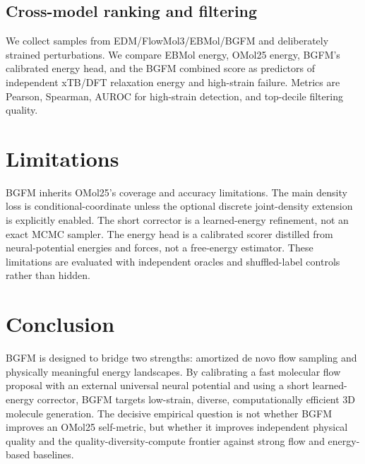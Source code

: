\documentclass{article}
\begin{document}
\subsection{Cross-model ranking and filtering}

We collect samples from EDM/FlowMol3/EBMol/BGFM and deliberately strained
perturbations. We compare EBMol energy, OMol25 energy, BGFM's calibrated
energy head, and the BGFM combined score as predictors of independent
xTB/DFT relaxation energy and high-strain failure. Metrics are Pearson,
Spearman, AUROC for high-strain detection, and top-decile filtering
quality.

\section{Limitations}

BGFM inherits OMol25's coverage and accuracy limitations. The main
density loss is conditional-coordinate unless the optional discrete
joint-density extension is explicitly enabled. The short corrector is a
learned-energy refinement, not an exact MCMC sampler. The energy head is
a calibrated scorer distilled from neural-potential energies and forces,
not a free-energy estimator. These limitations are evaluated with
independent oracles and shuffled-label controls rather than hidden.

\section{Conclusion}

BGFM is designed to bridge two strengths: amortized de novo flow
sampling and physically meaningful energy landscapes. By calibrating a
fast molecular flow proposal with an external universal neural potential
and using a short learned-energy corrector, BGFM targets low-strain,
diverse, computationally efficient 3D molecule generation. The decisive
empirical question is not whether BGFM improves an OMol25 self-metric,
but whether it improves independent physical quality and the
quality-diversity-compute frontier against strong flow and energy-based
baselines.
\end{document}
